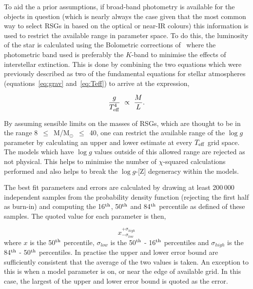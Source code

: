To aid the a prior assumptions, if broad-band photometry is available for the objects in question
(which is nearly always the case given that the most common way to select RSGs in based on the optical or near-IR colours) this information is used to restrict the available range in parameter space.
To do this, the luminosity of the star is calculated using the Bolometric corrections of~\citet{2013ApJ...767....3D} where the photometric band used is preferably the $K$-band to minimise the effects of interstellar extinction.
This is done by combining the two equations which were previously described as two of the fundamental equations for stellar atmospheres (equations~\ref{eq:grav} and~\ref{eq:Teff}) to arrive at the expression,

\begin{equation}
    \frac{g}{T^{4}_{\rm eff}}~\propto~\frac{M}{L}.
\end{equation}

By assuming sensible limits on the masses of RSGs, which are thought to be in the range 8~$\leq$~M/M$_{\odot}$~$\leq$~40, one can restrict the available range of the $\log g$ parameter by calculating an upper and lower estimate at every $T_{\rm eff}$ grid space.
The models which have $\log g$ values outside of this allowed range are rejected as not physical.
This helps to minimise the number of $\chi$-squared calculations performed and also helps to break the $\log g$-[Z] degeneracy within the models.

The best fit parameters and errors are calculated by drawing at least 200\,000 independent samples from the probability density function (rejecting the first half as burn-in) and computing the
16$^{\rm th}$, 50$^{\rm th}$ and 84$^{\rm th}$ percentile as defined of these samples.
The quoted value for each parameter is then,

\begin{equation}
     x_{-\sigma_{low}}^{+\sigma_{high}}
\end{equation}
\noindent where $x$ is the 50$^{\rm th}$ percentile, $\sigma_{low}$ is the 50$^{\rm th}$ - 16$^{\rm th}$ percentiles and $\sigma_{high}$ is the 84$^{\rm th}$ - 50$^{\rm th}$ percentiles.
In practise the upper and lower error bound are sufficiently consistent that the average of the two values is taken.
An exception to this is when a model parameter is on, or near the edge of available grid.
In this case, the largest of the upper and lower error bound is quoted as the error.



